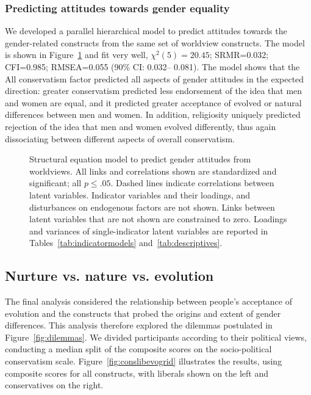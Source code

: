 \documentclass[fignum,man]{apa}\usepackage[]{graphicx}\usepackage[]{color}
\begin{document}
\subsubsection{Predicting attitudes towards gender equality}
We developed a parallel hierarchical model to predict attitudes towards the gender-related constructs from the same set of worldview constructs.
The model is shown in Figure~\ref{fig:genderSEM} and fit very well,
$\chi^2(5)=20.45$; 
SRMR=0.032; CFI=0.985; 
RMSEA=0.055 (90\% CI:
0.032--
0.081).
The model shows that the All conservatism factor predicted all aspects of gender attitudes in the expected direction: greater
conservatism predicted less endorsement of the idea that men and women are equal, and it predicted greater acceptance of
evolved or natural differences between men and women. In addition, religiosity uniquely predicted rejection of the idea that men and
women evolved differently, thus again dissociating between different aspects of overall conservatism.
\begin{figure}[tp] %
\caption{Structural equation model to predict gender attitudes from worldviews. 
	All links and correlations shown are 
	standardized and significant; all $p \leq .05$. Dashed lines indicate correlations between latent variables.
	Indicator variables and their loadings, and disturbances on endogenous factors are not
	shown. Links between latent variables that are not shown are 
	constrained to zero. 
	Loadings and variances of single-indicator latent 
	variables are reported in Tables~\ref{tab:indicatormodels}
	and~\ref{tab:descriptives}.}
\label{fig:genderSEM}
\end{figure}

\subsection{Nurture vs. nature vs. evolution}
The final analysis considered the relationship between people's
acceptance of evolution and the 
constructs that probed the origins and extent of gender differences. 
This analysis therefore explored the dilemmas postulated in 
Figure~\ref{fig:dilemmas}.
We divided participants according to their political views,
conducting a median split of the composite scores on the 
socio-political conservatism scale.
Figure~\ref{fig:conslibevogrid} illustrates the results,
using composite scores for all constructs, with liberals shown
on the left and conservatives on the right. 
\end{document}
